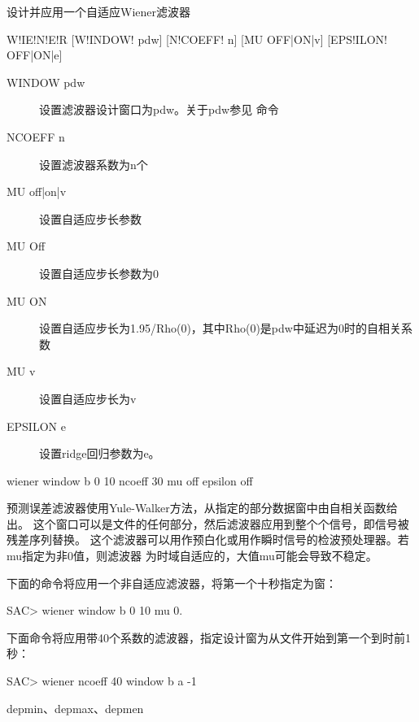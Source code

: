 \label{cmd:wiener}

设计并应用一个自适应Wiener滤波器

\begin{SACSTX}
W!IE!N!E!R [W!INDOW! pdw] [N!COEFF! n] [MU OFF|ON|v] [EPS!ILON! OFF|ON|e]
\end{SACSTX}

\begin{description}
\item [WINDOW pdw] 设置滤波器设计窗口为pdw。关于pdw参见  命令
\item [NCOEFF n] 设置滤波器系数为n个
\item [MU off|on|v] 设置自适应步长参数
\item [MU Off] 设置自适应步长参数为0
\item [MU ON] 设置自适应步长为1.95/Rho(0)，其中Rho(0)是pdw中延迟为0时的自相关系数
\item [MU v] 设置自适应步长为v
\item [EPSILON e] 设置ridge回归参数为e。
\end{description}

\begin{SACDFT}
wiener window b 0 10 ncoeff 30 mu off epsilon off
\end{SACDFT}

预测误差滤波器使用Yule-Walker方法，从指定的部分数据窗中由自相关函数给出。
这个窗口可以是文件的任何部分，然后滤波器应用到整个个信号，即信号被残差序列替换。
这个滤波器可以用作预白化或用作瞬时信号的检波预处理器。若mu指定为非0值，则滤波器
为时域自适应的，大值mu可能会导致不稳定。

下面的命令将应用一个非自适应滤波器，将第一个十秒指定为窗：
\begin{SACCode}
SAC> wiener window b 0 10 mu 0.
\end{SACCode}

下面命令将应用带40个系数的滤波器，指定设计窗为从文件开始到第一个到时前1秒：
\begin{SACCode}
SAC> wiener ncoeff 40 window b a -1
\end{SACCode}

depmin、depmax、depmen
